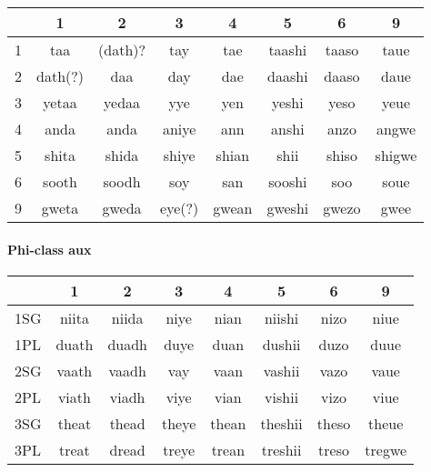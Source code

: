 \documentclass[8pt]{book}
\begin{document}
\begin{center}
	\begin{tabular}{|l|c|c|c|c|c|c|c|}
	\hline
	& 1 & 2 & 3 & 4 & 5 & 6 & 9 \\ \hline
	1 & taa & (dath)? & tay & tae & taashi & taaso & taue \\ \hline
	2 & dath(?) & daa & day & dae & daashi & daaso & daue \\ \hline
	3 & yetaa & yedaa & yye & yen & yeshi & yeso & yeue \\ \hline
	4 & anda & anda & aniye & ann & anshi & anzo & angwe \\ \hline
	5 & shita & shida & shiye & shian & shii & shiso & shigwe \\ \hline
    6 & sooth & soodh & soy & san & sooshi & soo & soue \\ \hline
    9 & gweta & gweda & eye(?) & gwean & gweshi & gwezo & gwee \\ \hline
	\end{tabular}
\end{center}

\paragraph{Phi-class aux}
\begin{center}
	\begin{tabular}{|l|c|c|c|c|c|c|c|}
	\hline
	& 1 & 2 & 3 & 4 & 5 & 6 & 9 \\ \hline
    1SG & niita & niida & niye & nian & niishi & nizo & niue  \\ \hline
    1PL & duath & duadh & duye & duan & dushii & duzo & duue \\ \hline 
    2SG & vaath & vaadh & vay & vaan & vashii & vazo & vaue \\ \hline
    2PL & viath & viadh & viye & vian & vishii & vizo & viue \\ \hline
  	3SG & theat & thead & theye & thean & theshii & theso & theue \\ \hline
  	3PL & treat & dread & treye & trean & treshii & treso & tregwe \\ \hline
	\end{tabular}
\end{center}
\end{document}
